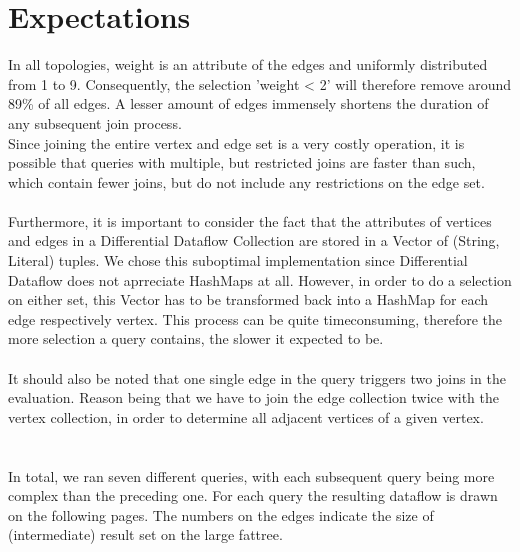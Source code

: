 \documentclass[11pt,singlecolumn]{scrartcl}
\begin{document}
\section{Expectations}
In all topologies, weight is an attribute of the edges and uniformly distributed from 1 to 9. Consequently, the selection 'weight < 2' will therefore remove around 89\% of all edges. A lesser amount of edges immensely shortens the duration of any subsequent join process.\\ Since joining the entire vertex and edge set is a very costly operation, it is possible that queries with multiple, but restricted joins are faster than such, which contain fewer joins, but do not include any restrictions on the edge set. \\\\
Furthermore, it is important to consider the fact that the attributes of vertices and edges in a Differential Dataflow Collection are stored in a Vector of (String, Literal) tuples. We chose this suboptimal implementation since Differential Dataflow does not aprreciate HashMaps at all. However, in order to do a selection on either set, this Vector has to be transformed back into a HashMap for each edge respectively vertex. This process can be quite timeconsuming, therefore the more selection a query contains, the slower it expected to be.\\\\
It should also be noted that one single edge in the query triggers two joins in the evaluation. Reason being that we have to join the edge collection twice with the vertex collection, in order to determine all adjacent vertices of a given vertex.\\\\\\
In total, we ran seven different queries, with each subsequent query being more complex than the preceding one. For each query the resulting dataflow is drawn on the following pages. The numbers on the edges indicate the size of (intermediate) result set on the large fattree.\clearpage
\end{document}
